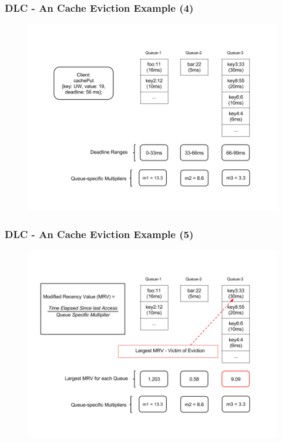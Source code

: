\documentclass{beamer}
\begin{document}
\begin{frame}
  \frametitle{DLC - An Cache Eviction Example (4)}
  \begin{figure}
    \begin{center}
      \centerline{\includegraphics[scale=0.33]{img/DLC_NEW_4.png}}
    \end{center}
  \end{figure}
\end{frame}


\begin{frame}
  \frametitle{DLC - An Cache Eviction Example (5)}
  \begin{figure}
    \begin{center}
      \centerline{\includegraphics[scale=0.33]{img/DLC_NEW_5.png}}
    \end{center}
  \end{figure}
\end{frame}
\end{document}
